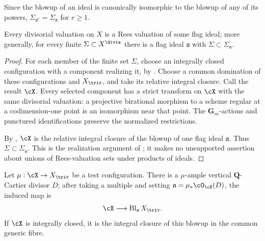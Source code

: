 Since the blowup of an ideal is canonically isomorphic to the blowup of any
of its powers, $\Sigma_{\mathfrak a^r}=\Sigma_{\mathfrak a}$ for
$r\geq1$.

\begin{lemma}\label{lem:ch33-rees-valuations-cover}
Every divisorial valuation on $X$ is a Rees valuation of some flag ideal;
more generally, for every finite $\Sigma\subset X^{\divis}$ there is a
flag ideal $\mathfrak a$ with $\Sigma\subset\Sigma_{\mathfrak a}$.
\end{lemma}

\begin{proof}
For each member of the finite set $\Sigma$, choose an integrally closed
configuration with a component realizing it, by
.  Choose a common domination of these
configurations and $X_{\triv}$, and take its relative integral closure.
Call the result $\cX$.  Every selected component has a strict transform
on $\cX$ with the same divisorial valuation: a projective birational
morphism to a scheme regular at a codimension-one point is an
isomorphism near that point.  The $\mathbf G_m$-actions and punctured
identifications preserve the normalized restrictions.

By , $\cX$ is the relative
integral closure of the blowup of one flag ideal $\mathfrak a$.
Thus $\Sigma\subset\Sigma_{\mathfrak a}$.  This is the realization
argument of \cite[Lemma~2.12]{BJ22}; it makes no unsupported assertion
about unions of Rees-valuation sets under products of ideals.
\end{proof}

\begin{lemma}\label{lem:ch33-projective-blowup-presentation}
Let $\mu:\cX\to X_{\triv}$ be a test configuration.  There is a
$\mu$-ample vertical $\mathbf Q$-Cartier divisor $D$; after taking a
multiple and setting $\mathfrak a=\mu_*\cO_{\cX}(D)$, the induced map is
\[
                 \cX\longrightarrow\operatorname{Bl}_{\mathfrak a}X_{\triv}.
\]
If $\cX$ is integrally closed, it is the integral closure of this blowup
in the common generic fibre.
\end{lemma}

